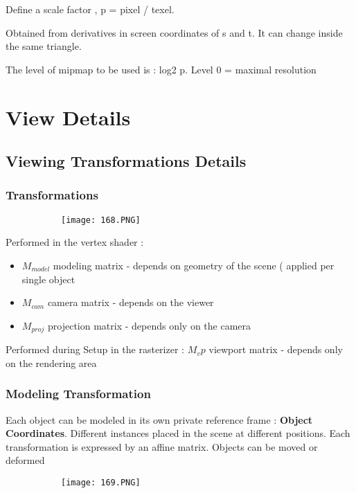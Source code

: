 \documentclass{article}
\begin{document}
Define a scale factor , p = pixel / texel.

Obtained from derivatives in screen coordinates of s and t.
It can change inside the same triangle.

The level of mipmap to be used is : log2 p. Level 0 = maximal resolution

\section{View Details}
\subsection{Viewing Transformations Details}

\subsubsection{Transformations}


\begin{figure}[ht!]
  \centering
  \begin{subfigure}[b]{0.75\linewidth}
    \texttt{[image: 168.PNG]}
  \end{subfigure}
\end{figure}

Performed in the vertex shader : 
\begin{itemize}
    \item $M_{model}$ modeling matrix - depends on geometry of the scene ( applied per single object
    \item $M_{cam}$ camera matrix - depends on the viewer
    \item $M_{proj}$ projection matrix - depends only on the camera
\end{itemize}

Performed during Setup in the rasterizer : $M_vp$ viewport matrix - depends only on the rendering area

\subsubsection{Modeling Transformation}

Each object can be modeled in its own private reference frame : \textbf{Object Coordinates}. Different instances placed in the scene at different positions. Each transformation is expressed by an affine matrix. Objects can be moved or deformed


\begin{figure}[ht!]
  \centering
  \begin{subfigure}[b]{0.3\linewidth}
    \texttt{[image: 169.PNG]}
  \end{subfigure}
\end{figure}
\end{document}
